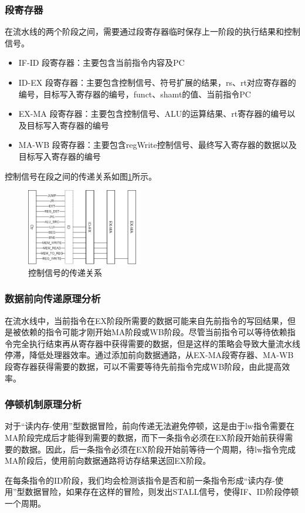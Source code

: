 \documentclass[UTF8]{ctexart}
\begin{document}
\subsubsection{段寄存器}
    在流水线的两个阶段之间，需要通过段寄存器临时保存上一阶段的执行结果和控制信号。
    \begin{itemize}
        \item IF-ID 段寄存器：主要包含当前指令内容及PC
        \item ID-EX 段寄存器：主要包含控制信号、符号扩展的结果，rs、rt对应寄存器的编号，目标写入寄存器的编号，funct、shamt的值、当前指令PC
        \item EX-MA 段寄存器：主要包含控制信号、ALU的运算结果、rt寄存器的编号以及目标写入寄存器的编号
        \item MA-WB 段寄存器：主要包含regWrite控制信号、最终写入寄存器的数据以及目标写入寄存器的编号
    \end{itemize}
    控制信号在段之间的传递关系如图\ref{fig:design-top-ctr-sig}所示。
    \begin{figure}[H]
        \centering
        \includegraphics[width=0.45\textwidth]{fig-design-top-ctr-sig}
        \caption{控制信号的传递关系}
        \label{fig:design-top-ctr-sig}
    \end{figure}
\subsubsection{数据前向传递原理分析}
    在流水线中，当前指令在EX阶段所需要的数据可能来自先前指令的写回结果，但是被依赖的指令可能才刚开始MA阶段或WB阶段。尽管当前指令可以等待依赖指令完全执行结束再从寄存器中获得需要的数据，但是这样的策略会导致大量流水线停滞，降低处理器效率。通过添加前向数据通路，从EX-MA段寄存器、MA-WB段寄存器获得需要的数据，可以不需要等待先前指令完成WB阶段，由此提高效率。
\subsubsection{停顿机制原理分析}
    对于“读内存-使用”型数据冒险，前向传递无法避免停顿，这是由于lw指令需要在MA阶段完成后才能得到需要的数据，而下一条指令必须在EX阶段开始前获得需要的数据。因此，后一条指令必须在EX阶段开始前等待一个周期，待lw指令完成MA阶段后，使用前向数据通路将访存结果送回EX阶段。\par
    在每条指令的ID阶段，我们均会检测该指令是否和前一条指令形成“读内存-使用”型数据冒险，如果存在这样的冒险，则发出STALL信号，使得IF、ID阶段停顿一个周期。
\end{document}

